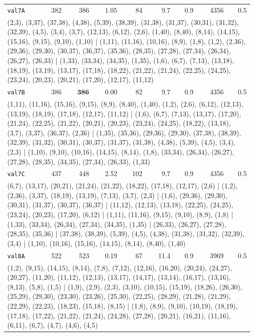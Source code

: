 \begin{longtable}{lrrrrrrrr}
\texttt{val7A} & 382 & 386 & 1.05 & 84 & 9.7 & 0.9 & 4356 & 0.5 \\
\multicolumn{9}{p{0.96\linewidth}}{\tiny\raggedright\arraybackslash (2,3), (3,37), (37,38), (4,38), (5,39), (38,39), (31,38), (31,37), (30,31), (31,32), (32,39), (4,5), (3,4), (3,7), (12,13), (6,12), (2,6), (1,40), (8,40), (8,14), (14,15), (15,16), (9,15), (9,10), (1,10) | (1,11), (11,16), (10,16), (8,9), (1,8), (1,2), (2,36), (29,36), (29,30), (30,37), (36,37), (35,36), (28,35), (27,28), (27,34), (26,34), (26,27), (26,33) | (1,33), (33,34), (34,35), (1,35), (1,6), (6,7), (7,13), (13,18), (18,19), (13,19), (13,17), (17,18), (18,22), (21,22), (21,24), (22,25), (24,25), (23,24), (20,23), (20,21), (17,20), (12,17), (11,12)} \\[2pt]
\texttt{val7B} & 386 & $\mathbf{386}$ & 0.00 & 82 & 9.7 & 0.9 & 4356 & 0.5 \\
\multicolumn{9}{p{0.96\linewidth}}{\tiny\raggedright\arraybackslash (1,11), (11,16), (15,16), (9,15), (8,9), (8,40), (1,40), (1,2), (2,6), (6,12), (12,13), (13,19), (18,19), (17,18), (12,17), (11,12) | (1,6), (6,7), (7,13), (13,17), (17,20), (21,24), (22,25), (21,22), (20,21), (20,23), (23,24), (24,25), (18,22), (13,18), (3,7), (3,37), (36,37), (2,36) | (1,35), (35,36), (29,36), (29,30), (37,38), (38,39), (32,39), (31,32), (30,31), (30,37), (31,37), (31,38), (4,38), (5,39), (4,5), (3,4), (2,3) | (1,10), (9,10), (10,16), (14,15), (8,14), (1,8), (33,34), (26,34), (26,27), (27,28), (28,35), (34,35), (27,34), (26,33), (1,33)} \\[2pt]
\texttt{val7C} & 437 & 448 & 2.52 & 102 & 9.7 & 0.9 & 4356 & 0.5 \\
\multicolumn{9}{p{0.96\linewidth}}{\tiny\raggedright\arraybackslash (6,7), (13,17), (20,21), (21,24), (21,22), (18,22), (17,18), (12,17), (2,6) | (1,2), (2,36), (3,37), (18,19), (13,19), (7,13), (3,7), (2,3) | (1,6), (29,36), (29,30), (30,31), (31,37), (30,37), (36,37) | (11,12), (12,13), (13,18), (22,25), (24,25), (23,24), (20,23), (17,20), (6,12) | (1,11), (11,16), (9,15), (9,10), (8,9), (1,8) | (1,33), (33,34), (26,34), (27,34), (34,35), (1,35) | (26,33), (26,27), (27,28), (28,35), (35,36) | (37,38), (38,39), (5,39), (4,5), (4,38), (31,38), (31,32), (32,39), (3,4) | (1,10), (10,16), (15,16), (14,15), (8,14), (8,40), (1,40)} \\[2pt]
\texttt{val8A} & 522 & 523 & 0.19 & 67 & 11.4 & 0.9 & 3969 & 0.5 \\
\multicolumn{9}{p{0.96\linewidth}}{\tiny\raggedright\arraybackslash (1,2), (9,15), (14,15), (8,14), (7,8), (7,12), (12,16), (16,20), (20,24), (24,27), (20,27), (11,20), (11,12), (12,13), (13,17), (14,17), (13,14), (16,17), (13,16), (8,13), (5,8), (1,5) | (1,9), (2,9), (2,3), (3,10), (10,15), (15,19), (18,26), (26,30), (25,29), (29,30), (23,30), (23,26), (25,30), (22,25), (28,29), (21,28), (21,29), (22,29), (22,23), (18,23), (15,18), (8,15) | (1,8), (8,9), (9,10), (10,19), (18,19), (17,18), (17,22), (21,22), (21,24), (24,28), (27,28), (20,21), (16,21), (11,16), (6,11), (6,7), (4,7), (4,6), (4,5)} \\[2pt]

\end{longtable}

